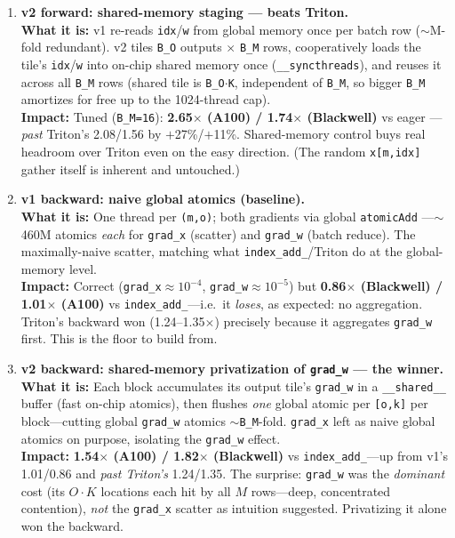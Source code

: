 \documentclass[11pt]{article}
\newcommand{\what}[1]{\textbf{What it is:} #1}
\newcommand{\impact}[1]{\textbf{Impact:} #1}
\begin{document}
\begin{enumerate}[leftmargin=*, resume]
\item \textbf{v2 forward: shared-memory staging --- beats Triton.}\\
\what{v1 re-reads \texttt{idx}/\texttt{w} from global memory once per batch row ($\sim$M-fold
redundant). v2 tiles \texttt{B\_O} outputs $\times$ \texttt{B\_M} rows, cooperatively loads the
tile's \texttt{idx}/\texttt{w} into on-chip shared memory once (\texttt{\_\_syncthreads}), and
reuses it across all \texttt{B\_M} rows (shared tile is \texttt{B\_O$\cdot$K}, independent of
\texttt{B\_M}, so bigger \texttt{B\_M} amortizes for free up to the 1024-thread cap).}\\
\impact{Tuned (\texttt{B\_M=16}): \textbf{2.65$\times$ (A100) / 1.74$\times$ (Blackwell)} vs eager
---\emph{past} Triton's 2.08/1.56 by $+$27\%/$+$11\%. Shared-memory control buys real headroom over
Triton even on the easy direction. (The random \texttt{x[m,idx]} gather itself is inherent and
untouched.)}

\item \textbf{v1 backward: naive global atomics (baseline).}\\
\what{One thread per \texttt{(m,o)}; both gradients via global \texttt{atomicAdd}
---$\sim$460M atomics \emph{each} for \texttt{grad\_x} (scatter) and \texttt{grad\_w} (batch
reduce). The maximally-naive scatter, matching what \texttt{index\_add\_}/Triton do at the
global-memory level.}\\
\impact{Correct (\texttt{grad\_x}$\approx$$10^{-4}$, \texttt{grad\_w}$\approx$$10^{-5}$) but
\textbf{0.86$\times$ (Blackwell) / 1.01$\times$ (A100)} vs \texttt{index\_add\_}---i.e.\ it
\emph{loses}, as expected: no aggregation. Triton's backward won (1.24--1.35$\times$) precisely
because it aggregates \texttt{grad\_w} first. This is the floor to build from.}

\item \textbf{v2 backward: shared-memory privatization of \texttt{grad\_w} --- the winner.}\\
\what{Each block accumulates its output tile's \texttt{grad\_w} in a \texttt{\_\_shared\_\_} buffer
(fast on-chip atomics), then flushes \emph{one} global atomic per \texttt{[o,k]} per block---cutting
global \texttt{grad\_w} atomics $\sim$\texttt{B\_M}-fold. \texttt{grad\_x} left as naive global
atomics on purpose, isolating the \texttt{grad\_w} effect.}\\
\impact{\textbf{1.54$\times$ (A100) / 1.82$\times$ (Blackwell)} vs \texttt{index\_add\_}---up from
v1's 1.01/0.86 and \emph{past Triton's} 1.24/1.35. The surprise: \texttt{grad\_w} was the
\emph{dominant} cost (its $O{\cdot}K$ locations each hit by all $M$ rows---deep, concentrated
contention), \emph{not} the \texttt{grad\_x} scatter as intuition suggested. Privatizing it alone
won the backward.}


\end{enumerate}
\end{document}
